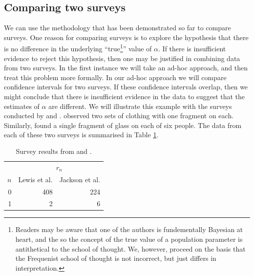 \documentclass{article}\usepackage[]{graphicx}\usepackage[]{xcolor}
\begin{document}
\subsection{Comparing two surveys}
We can use the methodology that has been demonstrated so far to compare surveys. One reason for comparing surveys is to explore the hypothesis that there is no difference in the underlying ``true\footnote{Readers may be aware that one of the authors is fundementally Bayesian at heart, and the so the concept of the true value of a population parameter is antithetical to the school of thought. We, however, proceed on the basis that the Frequenist school of thought is not incorrect, but just differs in interpretation.}'' value of $\alpha$. If there is insufficient evidence to reject this hypothesis, then one may be justified in combining data from two surveys. In the first instance we will take an ad-hoc approach, and then treat this problem more formally. In our ad-hoc approach we will compare confidence intervals for two surveys. If these confidence intervals overlap, then we might conclude that there is insufficient evidence in the data to suggest that the estimates of $\alpha$ are different. We will illustrate this example with the surveys conducted by \citet{lewis2023} and \citet{jackson2013}. \citet{lewis2023} observed two sets of clothing with one fragment on each. Similarly, \citet{jackson2013} found a single fragment of glass on each of six people. The data from each of these two surveys is summarised in Table \ref{tab:lewis_and_jackson}.
\begin{table}[ht]
\centering
\begin{tabular}{r|r|r}
  \multicolumn{1}{c}{} & \multicolumn{2}{c}{$r_n$} \\  $n$ & Lewis et al. & Jackson et al.  \\ \hline
0 & 408 & 224 \\ 
  1 & 2 & 6 \\ 
  \end{tabular}
\caption{Survey results from \citet{lewis2023} and \citet{jackson2013}.} 
\label{tab:lewis_and_jackson}
\end{table}
\end{document}
